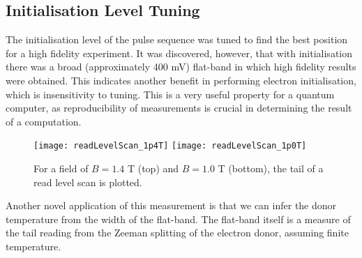 \subsection{Initialisation Level Tuning}
	The initialisation level of the pulse sequence was tuned to find the best position for a high fidelity experiment. It was discovered, however, that with initialisation there was a broad (approximately 400 mV) flat-band in which high fidelity results were obtained. This indicates another benefit in performing electron initialisation, which is insensitivity to tuning. This is a very useful property for a quantum computer, as reproducibility of measurements is crucial in determining the result of a computation.
%	
	\begin{figure}[htbp!]
		\flushleft
		\texttt{[image: readLevelScan\_1p4T]}
		\texttt{[image: readLevelScan\_1p0T]}
		\caption{For a field of $B = 1.4$ T (top) and $B = 1.0$ T (bottom), the tail of a read level scan is plotted.}
	\end{figure}
	
	Another novel application of this measurement is that we can infer the donor temperature from the width of the flat-band. The flat-band itself is a measure of the tail reading from the Zeeman splitting of the electron donor, assuming finite temperature.

